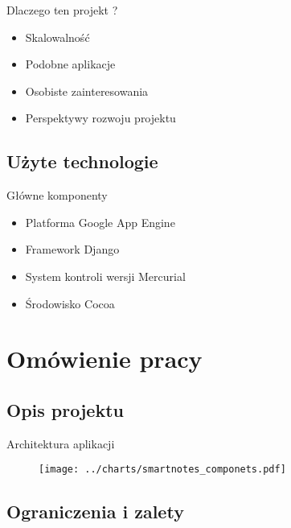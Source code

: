 \documentclass[slitetop]{beamer}
\begin{document}
\begin{frame}{Dlaczego ten projekt ?}
\begin{itemize}
\item{Skalowalność}
\item{Podobne aplikacje}
\item{Osobiste zainteresowania}
\item{Perspektywy rozwoju projektu}
\end{itemize}
\end{frame}

\subsection{Użyte technologie}

\begin{frame}{Główne komponenty}
\begin{itemize}
\item{Platforma Google App Engine}
\item{Framework  Django}
\item{System kontroli wersji Mercurial}
\item{Środowisko Cocoa}
\end{itemize}
\end{frame}

\section{Omówienie pracy}
\subsection{Opis projektu}

\begin{frame}{Architektura aplikacji}
\begin{figure}
	\begin{center}
		\texttt{[image: ../charts/smartnotes\_componets.pdf]}
  		\label{fig:smartnotes_components}
	\end{center}
\end{figure}
\end{frame}

\subsection{Ograniczenia i zalety}
\end{document}
